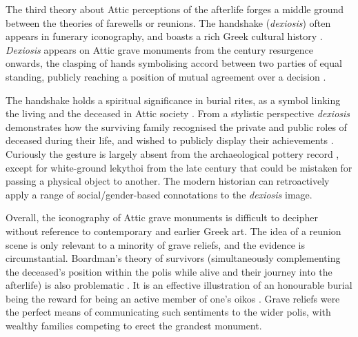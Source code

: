
The third theory about Attic perceptions of the afterlife forges a middle ground between the theories of farewells or reunions. The handshake (\textit{dexiosis}) often appears in funerary iconography, and boasts a rich Greek cultural history \parencite[96]{Stupperich1994}.
\textit{Dexiosis} appears on Attic grave monuments from the  century \BC resurgence onwards, the clasping of hands symbolising accord between two parties of equal standing, publicly reaching a position of mutual agreement over a decision \parencite[49]{Pemberton1989}.

The handshake holds a spiritual significance in burial rites, as a symbol linking the living and the deceased in Attic society \parencite[115]{Boardman1995}.
From a stylistic perspective \textit{dexiosis} demonstrates how the surviving family recognised the private and public roles of deceased during their life, and wished to publicly display their achievements \parencite[321]{Grossman2007}.
Curiously the gesture is largely absent from the archaeological pottery record \parencite[138]{Kurtz1971}, except for white-ground lekythoi from the late  century \BC that could be mistaken for passing a physical object to another. The modern historian can retroactively apply a range of social/gender-based connotations to the \textit{dexiosis} image.

Overall, the iconography of Attic grave monuments is difficult to decipher without reference to contemporary and earlier Greek art. The idea of a reunion scene is only relevant to a minority of grave reliefs, and the evidence is circumstantial. Boardman’s theory of survivors (simultaneously complementing the deceased’s position within the polis while alive and their journey into the afterlife) is also problematic \parencite[116]{Boardman1995}.
It is an effective illustration of an honourable burial being the reward for being an active member of one’s oikos \parencite[193]{Wasserman1969}. Grave reliefs were the perfect means of communicating such sentiments to the wider polis, with wealthy families competing to erect the grandest monument.


